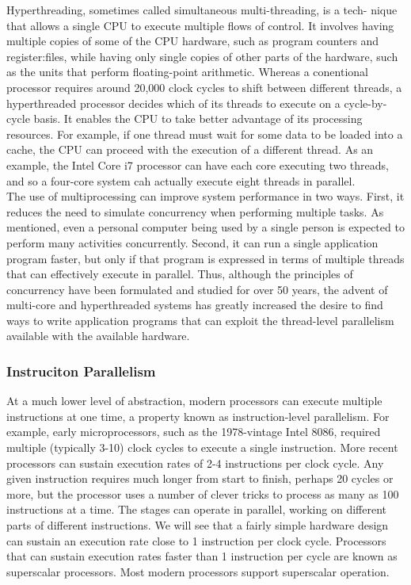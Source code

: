 \documentclass{article}
\begin{document}
Hyperthreading, sometimes called simultaneous multi-threading, is a tech-
nique that allows a single CPU to execute multiple flows of control. It involves
having multiple copies of some of the CPU hardware, such as program counters
and register:files, while having only single copies of other parts of the hardware,
such as the units that perform floating-point arithmetic. Whereas a conentional
processor requires around 20,000 clock cycles to shift between different threads,
a hyperthreaded processor decides which of its threads to execute on a cycle-by-
cycle basis. It enables the CPU to take better advantage of its processing resources.
For example, if one thread must wait for some data to be loaded into a cache, the
CPU can proceed with the execution of a different thread. As an example, the Intel 
Core i7 processor can have each core executing two threads, and so a four-core
system cah actually execute eight threads in parallel.\\

The use of multiprocessing can improve system performance in two ways.
First, it reduces the need to simulate concurrency when performing multiple tasks.
As mentioned, even a personal computer being used by a single person is expected
to perform many activities concurrently. Second, it can run a single application
program faster, but only if that program is expressed in terms of multiple threads
that can effectively execute in parallel. Thus, although the principles of concurrency
have been formulated and studied for over 50 years, the advent of multi-core
and hyperthreaded systems has greatly increased the desire to find ways to write
application programs that can exploit the thread-level parallelism available with 
the available hardware.


\subsubsection{Instruciton Parallelism}
At a much lower level of abstraction, modern processors can execute multiple
instructions at one time, a property known as instruction-level parallelism. For
example, early microprocessors, such as the 1978-vintage Intel 8086, required
multiple (typically 3-10) clock cycles to execute a single instruction. More recent
processors can sustain execution rates of 2-4 instructions per clock cycle. Any
given instruction requires much longer from start to finish, perhaps 20 cycles or
more, but the processor uses a number of clever tricks to process as many as 100
instructions at a time. The stages can operate in parallel, working on different parts of
different instructions. We will see that a fairly simple hardware design can sustain
an execution rate close to 1 instruction per clock cycle.
Processors that can sustain execution rates faster than 1 instruction per cycle
are known as superscalar processors. Most modern processors support superscalar
operation.
\end{document}
